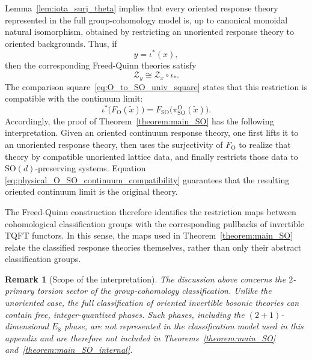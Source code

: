 \documentclass[aps,prx,reprint,superscriptaddress,twocolumn,amsmath,amssymb,amsfonts, nofootinbib]{revtex4-2}
\newcommand{\SO}{\text{SO}}
\theoremstyle{apsstyle}
\newtheorem{remark}[theorem]{Remark}
\begin{document}
Lemma~\ref{lem:iota_surj_theta} implies that every oriented response theory represented in the full group-cohomology model is, up to canonical monoidal natural isomorphism, obtained by restricting an unoriented response theory to oriented backgrounds. Thus, if
\begin{equation*}
    y=\iota^*(x),
\end{equation*}
then the corresponding Freed-Quinn theories satisfy
\begin{equation*}
    \mathcal Z_y
    \cong
    \mathcal Z_x\circ\iota_*.
\end{equation*}
The comparison square~\eqref{eq:O_to_SO_univ_square} states that this
restriction is compatible with the continuum limit:
\begin{equation}
    \iota^*\bigl(F_{\mathrm O}(\widetilde x)\bigr)
    =
    F_{\mathrm{SO}}
    \bigl(
        \pi^{\mathrm O}_{\mathrm{SO}}(\widetilde x)
    \bigr).
    \label{eq:physical_O_SO_continuum_compatibility}
\end{equation}
Accordingly, the proof of Theorem~\ref{theorem:main_SO} has the
following interpretation. Given an oriented continuum response theory,
one first lifts it to an unoriented response theory, then uses the
surjectivity of $F_{\mathrm O}$ to realize that theory by compatible
unoriented lattice data, and finally restricts those data to
$\SO(d)$-preserving systems. Equation
\eqref{eq:physical_O_SO_continuum_compatibility} guarantees that the
resulting oriented continuum limit is the original theory.

\noindent The Freed-Quinn construction therefore identifies the restriction
maps between cohomological classification groups with the corresponding
pullbacks of invertible TQFT functors. In this sense, the maps used in
Theorem~\ref{theorem:main_SO} relate the classified response theories
themselves, rather than only their abstract classification groups.


\begin{remark}[Scope of the interpretation]
The discussion above concerns the $2$-primary torsion sector of the
group-cohomology classification. Unlike the unoriented case, the full
classification of oriented invertible bosonic theories can contain
free, integer-quantized phases. Such phases, including the
$(2+1)$-dimensional $E_8$ phase, are not represented in the
classification model used in this appendix and are therefore not
included in Theorems~\ref{theorem:main_SO}
and~\ref{theorem:main_SO_internal}.
\end{remark}
\end{document}
